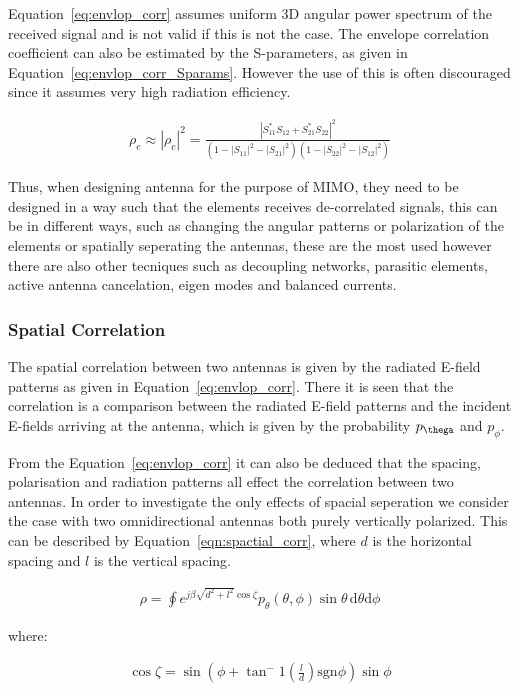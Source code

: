 Equation~\ref{eq:envlop_corr} assumes uniform 3D angular power spectrum of the received signal and is not valid if this is not the case. The envelope correlation coefficient can also be estimated by the S-parameters, as given in Equation~\ref{eq:envlop_corr_Sparams}\cite{Alain2010MIMO}. However the use of this is often discouraged since it assumes very high radiation efficiency. 

\begin{align}
  \rho_e \approx |\rho_c|^2 = \frac{|S^*_{11}S_{12}+S^*_{21}S_{22}|^2}{(1-|S_{11}|^2-|S_{21}|^2)(1-|S_{22}|^2-|S_{12}|^2)}
\end{align}

Thus, when designing antenna for the purpose of MIMO, they need to be designed in a way such that the elements receives de-correlated signals, this can be in different ways, such as changing the angular patterns or polarization of the elements or spatially seperating the antennas, these are the most used however there are also other tecniques such as decoupling networks, parasitic elements, active antenna cancelation, eigen modes and balanced currents. 

\subsubsection{Spatial Correlation}
The spatial correlation between two antennas  is given by the radiated E-field patterns as given in Equation~\ref{eq:envlop_corr}. There it is seen that the correlation is a comparison between the radiated E-field patterns and the incident E-fields arriving at the antenna, which is given by the probability $p_\thega$ and $p_\phi$. 

From the Equation~\ref{eq:envlop_corr} it can also be deduced that the spacing, polarisation and radiation patterns all effect the correlation between two antennas. In order to investigate the only effects of spacial seperation we consider the case with two omnidirectional antennas both purely vertically polarized. This can be described by Equation~\ref{eqn:spactial_corr}\cite{Tim2012Practical}, where $d$ is the horizontal spacing and $l$ is the vertical spacing. 

\begin{align}
  \rho = \oint e^{j\beta \sqrt{d^2+l^2}\cos\zeta}p_\theta(\theta,\phi)\sin\theta \, \mathrm{d} \theta \mathrm{d} \phi
\end{align}

where: 

\begin{align}
\cos \zeta = \sin(\phi + \tan^-1(\frac{l}{d}) \text{sgn}\phi)\sin\phi  
\end{align}

